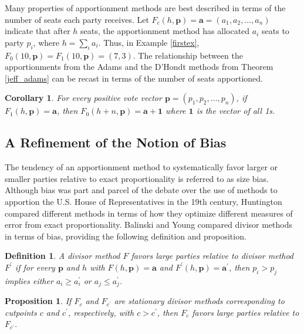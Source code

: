 \documentclass[pdflatex,sn-mathphys-num]{sn-jnl}
\theoremstyle{thmstyleone}%
\newtheorem{proposition}{Proposition}%
\newtheorem{corollary}{Corollary}
\theoremstyle{thmstyletwo}%
\theoremstyle{thmstylethree}%
\newtheorem{definition}{Definition}%
\begin{document}
Many  properties of apportionment methods are best described in terms of the number of seats each party receives.  Let $F_c(h, \mathbf p) = \mathbf a=(a_1, a_2, \ldots, a_n)$ indicate that after $h$ seats, the apportionment method has allocated $a_i$ seats to  party  $p_i$,  where $h=\sum_i a_i$. Thus, in Example \ref{firstex}, $F_0(10, \mathbf p) = F_1(10, \mathbf p)=(7,3)$.  The relationship between the apportionments from the Adams and the D'Hondt methods from Theorem \ref{jeff_adams} can be recast in terms of the number of seats apportioned.

\begin{corollary}
For every positive vote vector $\mathbf p = (p_1, p_2, \ldots, p_n)$, if $F_1(h,\mathbf p) = \mathbf a$, then $F_0(h+n, \mathbf p) = \mathbf a + \mathbf 1$ where $\mathbf 1$ is the vector of all 1s.
\end{corollary}

\subsection{A Refinement of the Notion of Bias}

The tendency of an apportionment method to systematically favor larger or smaller parties relative to exact proportionality is referred to as size bias. Although bias was part and parcel of the debate over the use of methods to apportion the U.S. House of Representatives in the 19th century, Huntington \cite{H1, H2} compared different methods in terms of how they optimize different measures of error from exact proportionality. Balinski and Young \cite{BY} compared divisor methods in terms of bias, providing the following definition and proposition.

\begin{definition}
A divisor method $F$ favors large parties relative to divisor method $F^\prime$ if for every $\mathbf p$ and $h$ with $F(h, \mathbf p) = \mathbf a$ and $F^\prime(h, \mathbf p) = \mathbf a^\prime$, then $p_i>p_j$ implies either $a_i \ge a_i^\prime$ or $a_j \le a_j^\prime$.
\end{definition}


\begin{proposition}\label{storder}
If $F_c$ and $F_{c^\prime}$ are stationary divisor methods corresponding to cutpoints $c$ and $c^\prime$, respectively, with $c > c^\prime$,  then $F_c$ favors large parties relative to $F_{c^\prime}$.
\end{proposition} 
\end{document}
